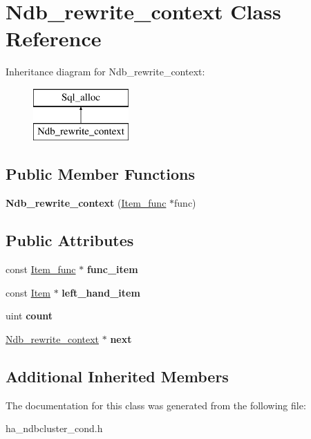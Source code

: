 \hypertarget{classNdb__rewrite__context}{}\section{Ndb\+\_\+rewrite\+\_\+context Class Reference}
\label{classNdb__rewrite__context}
Inheritance diagram for Ndb\+\_\+rewrite\+\_\+context\+:\begin{figure}[H]
\begin{center}
\leavevmode
\includegraphics[height=2.000000cm]{classNdb__rewrite__context}
\end{center}
\end{figure}
\subsection*{Public Member Functions}
\begin{DoxyCompactItemize}
\item 
\mbox{\label{classNdb__rewrite__context_a530cbe4962d6f421c30a75b13fa52e9a}} 
{\bfseries Ndb\+\_\+rewrite\+\_\+context} (\mbox{\hyperlink{classItem__func}{Item\+\_\+func}} $\ast$func)
\end{DoxyCompactItemize}
\subsection*{Public Attributes}
\begin{DoxyCompactItemize}
\item 
\mbox{\label{classNdb__rewrite__context_aa07989071a6d4458d3e98ab1434b3ad6}} 
const \mbox{\hyperlink{classItem__func}{Item\+\_\+func}} $\ast$ {\bfseries func\+\_\+item}
\item 
\mbox{\label{classNdb__rewrite__context_ab7d78c6613d530cbb019458cfb5ec10d}} 
const \mbox{\hyperlink{classItem}{Item}} $\ast$ {\bfseries left\+\_\+hand\+\_\+item}
\item 
\mbox{\label{classNdb__rewrite__context_a6f6fe45adc68beb1ea0708e1cfa440fa}} 
uint {\bfseries count}
\item 
\mbox{\label{classNdb__rewrite__context_a5fb4f9b163593a1507a6a2b648cad57f}} 
\mbox{\hyperlink{classNdb__rewrite__context}{Ndb\+\_\+rewrite\+\_\+context}} $\ast$ {\bfseries next}
\end{DoxyCompactItemize}
\subsection*{Additional Inherited Members}


The documentation for this class was generated from the following file\+:\begin{DoxyCompactItemize}
\item 
ha\+\_\+ndbcluster\+\_\+cond.\+h\end{DoxyCompactItemize}
